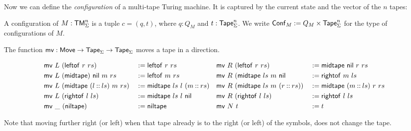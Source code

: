 
Now we can define the \emph{configuration} of a multi-tape Turing machine.  It is captured by the current state and the vector of the $n$ tapes:
\begin{definition}[Configuration][mconfig]
  \label{def:config}
  A configuration of $M: \mathsf{TM}_\Sigma^n$ is a tuple $c = (q, t)$, where $q: Q_M$ and $t: \mathsf{Tape}_\Sigma^n$.  We write
  $\mathsf{Conf}_M := Q_M \times \mathsf{Tape}_\Sigma^n$ for the type of configurations of $M$.
\end{definition}

The function $\mathsf{mv} : \mathsf{Move} \rightarrow \mathsf{Tape}_\Sigma \rightarrow \mathsf{Tape}_\Sigma$ moves a tape in a direction.
\begin{definition}
  \footnotesize
  \begin{alignat*}{4}
    & \mathsf{mv}~L~(\mathsf{leftof}~r~rs)                &&:= \mathsf{leftof}~r~rs
    && \mathsf{mv}~R~(\mathsf{leftof}~r~rs)               &&:= \mathsf{midtape}~\mathsf{nil}~r~rs \\
    & \mathsf{mv}~L~(\mathsf{midtape})~\mathsf{nil}~m~rs          &&:= \mathsf{leftof}~m~rs
    && \mathsf{mv}~R~(\mathsf{midtape}~ls~m~\mathsf{nil}          &&:= \mathsf{rightof}~m~ls \\
    & \mathsf{mv}~L~(\mathsf{midtape}~(l \mathbin{::} ls)~m~rs)  &&:= \mathsf{midtape}~ls~l~(m \mathbin{::} rs)
    && \mathsf{mv}~R~(\mathsf{midtape}~ls~m~(r \mathbin{::} rs)) &&:= \mathsf{midtape}~(m \mathbin{::} ls)~r~rs \\
    & \mathsf{mv}~L~(\mathsf{rightof}~l~ls)               &&:= \mathsf{midtape}~ls~l~\mathsf{nil}
    && \mathsf{mv}~R~(\mathsf{rightof}~l~ls)              &&:= \mathsf{rightof}~l~ls \\
    & \mathsf{mv}~\_~(\mathsf{niltape})                   &&:= \mathsf{niltape}
    && \mathsf{mv}~N~t                                &&:= t
  \end{alignat*}
\end{definition}
Note that moving further right (or left) when that tape already is to the right (or left) of the symbols, does not change the tape.

